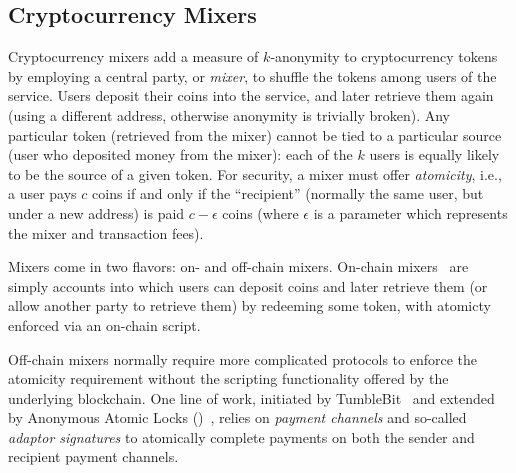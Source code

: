 \subsection{Cryptocurrency Mixers}

Cryptocurrency mixers add a measure of $k$-anonymity to cryptocurrency tokens by employing a central party, or \emph{mixer}, to shuffle the tokens among users of the service. Users deposit their coins into the service, and later retrieve them again (using a different address, otherwise anonymity is trivially broken).
Any particular token (retrieved from the mixer) cannot be tied to a particular source (user who deposited money from the mixer): each of the $k$ users is equally likely to be the source of a given token. For security, a mixer must offer \emph{atomicity}, i.e., a user pays $c$ coins if and only if the ``recipient'' (normally the same user, but under a new address) is paid $c-\epsilon$ coins (where $\epsilon$ is a parameter which represents the mixer and transaction fees). 

Mixers come in two flavors: on- and off-chain mixers. On-chain mixers~\cite{} are simply accounts into which users can deposit coins and later retrieve them (or allow another party to retrieve them) by redeeming some token, with atomicty enforced via an on-chain script. 

Off-chain mixers normally require more complicated protocols to enforce the atomicity requirement without the scripting functionality offered by the underlying blockchain. One line of work, initiated by TumbleBit~\cite{NDSS:HABSG17} and extended by Anonymous Atomic Locks (\AAL)~\cite{SP:TaiMorMaf21}, relies on \emph{payment channels} and so-called \emph{adaptor signatures} to atomically complete payments on both the sender and recipient payment channels. 


